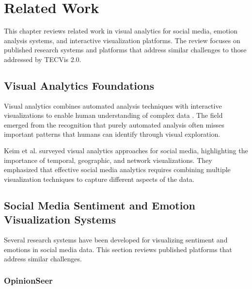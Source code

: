 
\chapter{Related Work}
\label{Chapter2}


This chapter reviews related work in visual analytics for social media, emotion analysis systems, and interactive visualization platforms. The review focuses on published research systems and platforms that address similar challenges to those addressed by TECVis 2.0.


\section{Visual Analytics Foundations}

Visual analytics combines automated analysis techniques with interactive visualizations to enable human understanding of complex data \cite{thomas2005visual}. The field emerged from the recognition that purely automated analysis often misses important patterns that humans can identify through visual exploration.

Keim et al. \cite{keim2013visual} surveyed visual analytics approaches for social media, highlighting the importance of temporal, geographic, and network visualizations. They emphasized that effective social media analytics requires combining multiple visualization techniques to capture different aspects of the data.


\section{Social Media Sentiment and Emotion Visualization Systems}

Several research systems have been developed for visualizing sentiment and emotions in social media data. This section reviews published platforms that address similar challenges.

\subsection{OpinionSeer}

